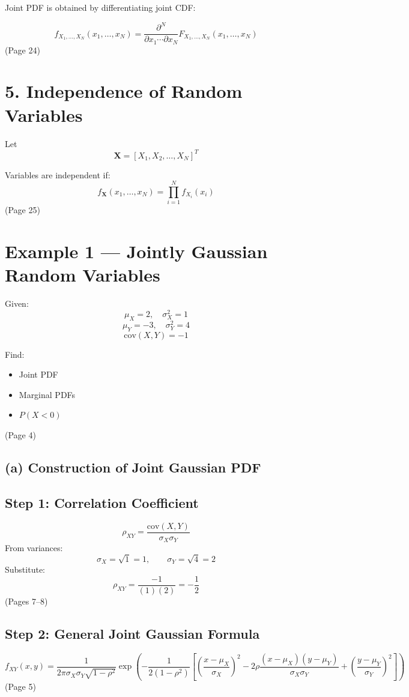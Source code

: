 \documentclass{article}
\begin{document}
Joint PDF is obtained by differentiating joint CDF:

\[f_{X_1,\ldots,X_N}(x_1,\ldots,x_N)=\frac{\partial^N}{\partial x_1\cdots \partial x_N}F_{X_1,\ldots,X_N}(x_1,\ldots,x_N)\]
(Page 24)

\section*{5. Independence of Random Variables}

Let
\[\mathbf{X}=[X_1,X_2,\ldots,X_N]^T\]

Variables are independent if:
\[f_{\mathbf{X}}(x_1,\ldots,x_N)=\prod_{i=1}^{N} f_{X_i}(x_i)\]
(Page 25)

\section*{Example 1 — Jointly Gaussian Random Variables}

Given:
\[\mu_X=2,\quad \sigma_X^2=1\]
\[\mu_Y=-3,\quad \sigma_Y^2=4\]
\[\text{cov}(X,Y)=-1\]

Find:
\begin{itemize}
    \item[(a)] Joint PDF
    \item[(b)] Marginal PDFs
    \item[(c)] $P(X<0)$
\end{itemize}
(Page 4)

\subsection*{(a) Construction of Joint Gaussian PDF}

\subsection*{Step 1: Correlation Coefficient}

\[\rho_{XY}=\frac{\text{cov}(X,Y)}{\sigma_X\sigma_Y}\]
From variances: 
\[\sigma_X=\sqrt{1}= 1,\qquad \sigma_Y=\sqrt{4}= 2\]
Substitute:
\[\rho_{XY}=\frac{-1}{(1)(2)}= -\frac{1}{2}\]
(Pages 7–8)

\subsection*{Step 2: General Joint Gaussian Formula}

\[f_{XY}(x,y)=\frac{1}{2\pi\sigma_X\sigma_Y\sqrt{1-\rho^2}}\exp\left(-\frac{1}{2(1-\rho^2)}\left[\left(\frac{x-\mu_X}{\sigma_X}\right)^2-2\rho\frac{(x-\mu_X)(y-\mu_Y)}{\sigma_X\sigma_Y}+\left(\frac{y-\mu_Y}{\sigma_Y}\right)^2\right]\right)\]
(Page 5)
\end{document}

